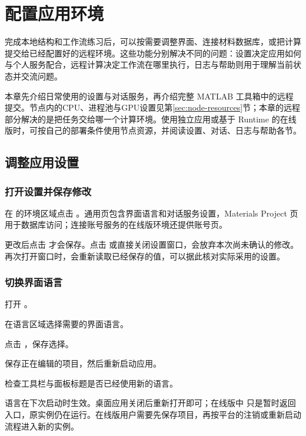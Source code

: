 \chapter{配置应用环境}\label{ch:remote}

完成本地结构和工作流练习后，可以按需要调整界面、连接材料数据库，或把计算提交给已经配置好的远程环境。这些功能分别解决不同的问题：设置决定应用如何与个人服务配合，远程计算决定工作流在哪里执行，日志与帮助则用于理解当前状态并交流问题。

本章先介绍日常使用的设置与对话服务，再介绍完整 MATLAB\regmark{} 工具箱中的远程提交。节点内的CPU、进程池与GPU设置见第\ref{sec:node-resources}节；本章的远程部分解决的是把任务交给哪一个计算环境。使用独立应用或基于 Runtime 的在线版时，可按自己的部署条件使用节点资源，并阅读设置、对话、日志与帮助各节。

\section{调整应用设置}

\subsection{打开设置并保存修改}

在  的环境区域点击 。通用页包含界面语言和对话服务设置，Materials Project 页用于数据库访问；连接账号服务的在线版环境还提供账号页。

更改后点击  才会保存。点击  或直接关闭设置窗口，会放弃本次尚未确认的修改。再次打开窗口时，会重新读取已经保存的值，可以据此核对实际采用的设置。

\subsection{切换界面语言}

\begin{steps}
\item 打开 。
\item 在语言区域选择需要的界面语言。
\item 点击 ，保存选择。
\item 保存正在编辑的项目，然后重新启动应用。
\item 检查工具栏与面板标题是否已经使用新的语言。
\end{steps}

语言在下次启动时生效。桌面应用关闭后重新打开即可；在线版中  只是暂时返回入口，原实例仍在运行。在线版用户需要先保存项目，再按平台的注销或重新启动流程进入新的实例。

